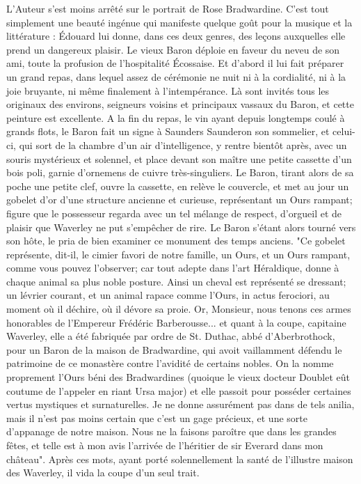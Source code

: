 L'Auteur s'est moins arrêté sur le portrait de Rose Bradwardine. C'est tout simplement une beauté ingénue qui manifeste quelque goût pour la musique et la littérature : Édouard lui donne, dans ces deux genres, des leçons auxquelles elle prend un dangereux plaisir.
Le vieux Baron déploie en faveur du neveu de son ami, toute la profusion de l'hospitalité Écossaise. Et d'abord il lui fait préparer un grand repas, dans lequel assez de cérémonie ne nuit ni à la cordialité, ni à la joie bruyante, ni même finalement à l'intempérance. Là sont invités tous les originaux des environs, seigneurs voisins et principaux vassaux du Baron, et cette peinture est excellente.\setcounter{page}{550} A la fin du repas, le vin ayant depuis longtemps coulé à grands flots, le Baron fait un signe à Saunders Saunderon son sommelier, et celui-ci, qui sort de la chambre d’un air d’intelligence, y rentre bientôt après, avec un souris mystérieux et solennel, et place devant son maître une petite cassette d’un bois poli, garnie d’ornemens de cuivre très-singuliers. Le Baron, tirant alors de sa poche une petite clef, ouvre la cassette, en relève le couvercle, et met au jour un gobelet d’or d’une structure ancienne et curieuse, représentant un Ours rampant; figure que le possesseur regarda avec un tel mélange de respect, d’orgueil et de plaisir que Waverley ne put s’empêcher de rire. Le Baron s’étant alors tourné vers son hôte, le pria de bien examiner ce monument des temps anciens. "Ce gobelet représente, dit-il, le cimier favori de notre famille, un Ours, et un Ours rampant, comme vous pouvez l’observer; car tout adepte dans l’art Héraldique, donne à chaque animal sa plus noble posture. Ainsi un cheval est représenté se dressant; un lévrier courant, et un animal rapace comme l’Ours, in actus ferociori, au moment où il déchire, où il dévore sa proie. Or, Monsieur, nous tenons ces armes honorables de l’Empereur\setcounter{page}{551} Frédéric Barberousse... et quant à la coupe, capitaine Waverley, elle a été fabriquée par ordre de St. Duthac, abbé d'Aberbrothock, pour un Baron de la maison de Bradwardine, qui avoit vaillamment défendu le patrimoine de ce monastère contre l'avidité de certains nobles. On la nomme proprement l'Ours béni des Bradwardines (quoique le vieux docteur Doublet eût coutume de l'appeler en riant Ursa major) et elle passoit pour posséder certaines vertus mystiques et surnaturelles. Je ne donne assurément pas dans de tels anilia, mais il n'est pas moins certain que c'est un gage précieux, et une sorte d'appanage de notre maison. Nous ne la faisons paroître que dans les grandes fêtes, et telle est à mon avis l'arrivée de l'héritier de sir Everard dans mon château". Après ces mots, ayant porté solennellement la santé de l'illustre maison des Waverley, il vida la coupe d'un seul trait.
